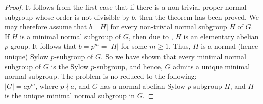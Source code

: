 \begin{proof}
    It follows from the first case that if there is a non-trivial proper normal subgroup whose order is not divisible by $b$, then the theorem has been proved. We may therefore assume that $b\mid |H|$ for every non-trivial normal subgroup $H$ of $G$. If $H$ is a minimal normal subgroup of $G$, then due to , $H$ is an elementary abelian $p$-group. It follows that $b = p^m = |H|$ for some $m \ge 1$. Thus, $H$ is a normal (hence unique) Sylow $p$-subgroup of $G$. So we have shown that every minimal normal subgroup of $G$ is the Sylow $p$-subgroup, and hence, $G$ admits a unique minimal normal subgroup. The problem is no reduced to the following:\\

    \noindent{} $|G| = ap^m$, where $p\nmid a$, and $G$ has a normal abelian Sylow $p$-subgroup $H$, and $H$ is the unique minimal normal subgroup in $G$.


\end{proof}
